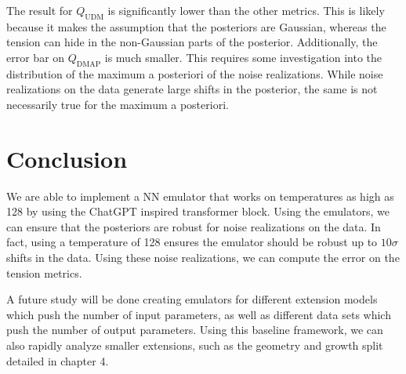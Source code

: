 The result for $Q_{\mathrm{UDM}}$ is significantly lower than the other metrics. This is likely because it makes the assumption that the posteriors are Gaussian, whereas the tension can hide in the non-Gaussian parts of the posterior. Additionally, the error bar on $Q_{\mathrm{DMAP}}$ is much smaller. This requires some investigation into the distribution of the maximum a posteriori of the noise realizations. While noise realizations on the data generate large shifts in the posterior, the same is not necessarily true for the maximum a posteriori.

\section{Conclusion}
We are able to implement a NN emulator that works on temperatures as high as 128 by using the ChatGPT inspired transformer block. Using the emulators, we can ensure that the posteriors are robust for noise realizations on the data. In fact, using a temperature of 128 ensures the emulator should be robust up to $10\sigma$ shifts in the data. Using these noise realizations, we can compute the error on the tension metrics.

A future study will be done creating emulators for different extension models which push the number of input parameters, as well as different data sets which push the number of output parameters. Using this baseline framework, we can also rapidly analyze smaller extensions, such as the geometry and growth split detailed in chapter 4.








